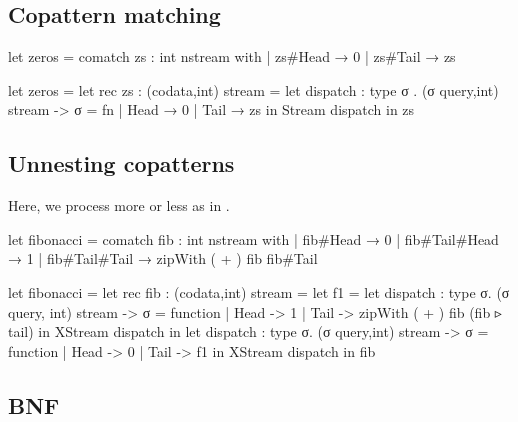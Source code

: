 \subsection{Copattern matching}

\sourcecode
\begin{code}
let zeros = comatch zs : int nstream with
  | zs#Head  → 0
  | zs#Tail  → zs
\end{code}

\gencode
\begin{code}
let zeros =
  let rec zs : (codata,int) stream =
    let dispatch : type σ . (σ query,int) stream -> σ = fn
        | Head  → 0
        | Tail  → zs
    in Stream {dispatch}
  in zs
\end{code}

\subsection{Unnesting copatterns}

Here, we process more or less as in \cite{setzer2014unnesting}.

\sourcecode
\begin{code}
let fibonacci = comatch fib : int nstream with
  | fib#Head  → 0
  | fib#Tail#Head  → 1
  | fib#Tail#Tail  → zipWith ( + ) fib fib#Tail
\end{code}

\gencode
\begin{code}
let fibonacci =
  let rec fib : (codata,int) stream =
    let f1 =
      let dispatch : type σ. (σ query, int) stream -> σ = function
        | Head -> 1
        | Tail -> zipWith ( + ) fib (fib ▹ tail)
      in XStream {dispatch}
    in
    let dispatch : type σ. (σ query,int) stream -> σ = function
     | Head -> 0
     | Tail -> f1
    in XStream {dispatch}
  in fib
\end{code}


\subsection{BNF}
